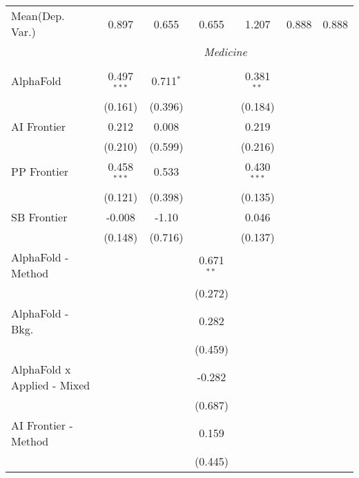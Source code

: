 \begin{tabular}{lcccccc}
Mean(Dep. Var.) & 0.897 & 0.655 & 0.655 & 1.207 & 0.888 & 0.888 \\
 & \multicolumn{6}{c}{\textit{Medicine}} \\ \\
   AlphaFold                     & 0.497$^{***}$ & 0.711$^{*}$ &               & 0.381$^{**}$  &        &   \\   
                                 & (0.161)       & (0.396)     &               & (0.184)       &        &   \\   
   AI Frontier                   & 0.212         & 0.008       &               & 0.219         &        &   \\   
                                 & (0.210)       & (0.599)     &               & (0.216)       &        &   \\   
   PP Frontier                   & 0.458$^{***}$ & 0.533       &               & 0.430$^{***}$ &        &   \\   
                                 & (0.121)       & (0.398)     &               & (0.135)       &        &   \\   
   SB Frontier                   & -0.008        & -1.10       &               & 0.046         &        &   \\   
                                 & (0.148)       & (0.716)     &               & (0.137)       &        &   \\   
   AlphaFold - Method            &               &             & 0.671$^{**}$  &               &        &   \\   
                                 &               &             & (0.272)       &               &        &   \\   
   AlphaFold - Bkg.              &               &             & 0.282         &               &        &   \\   
                                 &               &             & (0.459)       &               &        &   \\   
   AlphaFold x Applied - Mixed   &               &             & -0.282        &               &        &   \\   
                                 &               &             & (0.687)       &               &        &   \\   
   AI Frontier - Method          &               &             & 0.159         &               &        &   \\   
                                 &               &             & (0.445)       &               &        &   \\   

\end{tabular}
